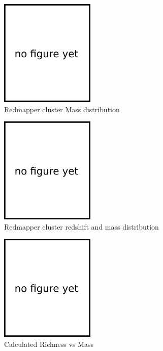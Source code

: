 \documentclass[twocolumn]{article}
\begin{document}
\begin{figure}[H]
  \center\includegraphics[width=0.4\textwidth]{figs/404.png}
  \caption{Redmapper cluster Mass distribution}
  \label{fig:redmapper_mass}
\end{figure}

\begin{figure}[H]
  \center\includegraphics[width=0.4\textwidth]{figs/404.png}
  \caption{Redmapper cluster redshift and mass distribution}
  \label{fig:redmapper_redshift_mass}
\end{figure}

\begin{figure}[H]
  \center\includegraphics[width=0.4\textwidth]{figs/404.png}
  \caption{Calculated Richness vs Mass}
  \label{fig:redmapper_richness_mass}
\end{figure}
\end{document}
